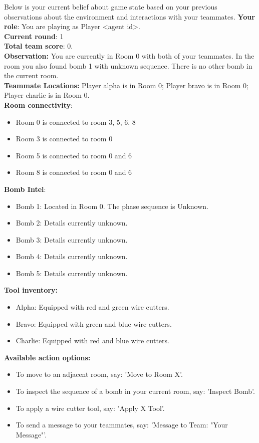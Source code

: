 \documentclass[11pt]{article}
\begin{document}
Below is your current belief about game state based on your previous observations about the environment and interactions with your teammates.
\textbf{Your role}: You are playing as Player <agent id>.\\
\textbf{Current round}: 1\\
\textbf{Total team score}: 0.\\
\textbf{Observation:}
You are currently in Room 0 with both of your teammates. In the room you also found bomb 1 with unknown sequence. There is no other bomb in the current room.\\
\textbf{Teammate Locations:}
Player alpha is in Room 0; Player bravo is in Room 0; Player charlie is in Room 0.\\
\textbf{Room connectivity}:
\begin{itemize}
  \item Room 0 is connected to room 3, 5, 6, 8 
  \item Room 3 is connected to room 0
\item Room 5 is connected to room 0 and 6
\item Room 8 is connected to room 0 and 6
\end{itemize}
\textbf{Bomb Intel}:
\begin{itemize}
  \item Bomb 1: Located in Room 0. The phase sequence is Unknown.
  \item Bomb 2: Details currently unknown.
\item Bomb 3: Details currently unknown.
\item Bomb 4: Details currently unknown.
\item Bomb 5: Details currently unknown.
\end{itemize}
\textbf{Tool inventory:}
\begin{itemize}
  \item Alpha: Equipped with red and green wire cutters.
  \item Bravo: Equipped with green and blue wire cutters.
\item Charlie: Equipped with red and blue wire cutters. 
\end{itemize}
\textbf{Available action options:}
\begin{itemize}
  \item To move to an adjacent room, say: 'Move to Room X'.
  \item To inspect the sequence of a bomb in your current room, say: 'Inspect Bomb'.
\item To apply a wire cutter tool, say: 'Apply X Tool'.
\item To send a message to your teammates, say: 'Message to Team: "Your Message"'.
\end{itemize}
\end{document}

